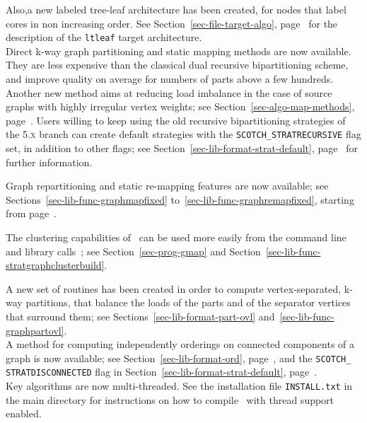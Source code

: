 Also,a new labeled tree-leaf architecture has been created, for nodes
that label cores in non increasing order. See
Section~\ref{sec-file-target-algo},
page~\pageref{sec-file-target-algo} for the description of the
\texttt{ltleaf} target architecture.
\\

Direct k-way graph partitioning and static mapping methods are now
available. They are less expensive than the classical dual recursive
bipartitioning scheme, and improve quality on average for numbers of
parts above a few hundreds. Another new method aims at reducing load
imbalance in the case of source graphs with highly irregular vertex
weights; see Section~\ref{sec-algo-map-methods},
page~\pageref{sec-algo-map-methods}. Users willing to keep using the
old recursive bipartitioning strategies of the \textsc{5.x} branch can
create default strategies with the \texttt{SCOTCH\_\lbt STRATRECURSIVE}
flag set, in addition to other flags; see
Section~\ref{sec-lib-format-strat-default},
page~\pageref{sec-lib-format-strat-default} for further information.

Graph repartitioning and static re-mapping features are now available;
see Sections~\ref{sec-lib-func-graphmapfixed}
to~\ref{sec-lib-func-graphremapfixed}, starting from
page~\pageref{sec-lib-func-graphmapfixed}.

The clustering capabilities of \scotch\ can be used more easily from
the command line and library calls~; see Section~\ref{sec-prog-gmap}
and Section~\ref{sec-lib-func-stratgraphclusterbuild}.

A new set of routines has been created in order to compute
vertex-separated, k-way partitions, that balance the loads of the
parts and of the separator vertices that surround them; see
Sections~\ref{sec-lib-format-part-ovl}
and~\ref{sec-lib-func-graphpartovl}.
\\

A method for computing independently orderings on connected components
of a graph is now available; see Section~\ref{sec-lib-format-ord},
page~\pageref{sec-lib-format-ord}, and the \texttt{SCOTCH\_\lbt
STRAT\lbt DISCON\lbt NECTED} flag in
Section~\ref{sec-lib-format-strat-default},
page~\pageref{sec-lib-format-strat-default}.
\\

Key algorithms are now multi-threaded. See the installation file
\texttt{INSTALL.txt} in the main directory for instructions on how to
compile \scotch\ with thread support enabled.
\\

